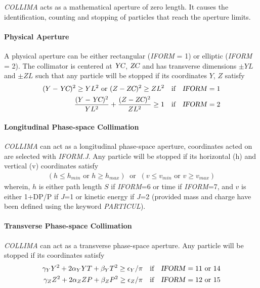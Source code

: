 \textsl{COLLIMA}  acts as a mathematical aperture of zero length.  It causes 
the identification, counting and stopping of particles that reach the aperture limits.  

\paragraph{Physical Aperture}

\noindent A physical aperture can be either rectangular (\textsl{IFORM} = 1) or elliptic 
(\textsl{IFORM} = 2).  The collimator is centered at $ \textsl{YC}$, $\textsl{ZC} $ and has transverse
dimensions $\pm YL $ and $\pm ZL $ such that any particle will be
stopped if its coordinates $Y$, $Z $ satisfy
\begin{align*}
	(Y-\textsl{YC})^2\geq  YL^2  \text{ or }   (Z-\textsl{ZC})^2 \geq  ZL^2 
	   &   \quad \text{if}\quad  \text{\textsl{IFORM}}=1  \\
	\dfrac{ (Y-\textsl{YC})^2 }{ YL^2} + \dfrac{(Z-\textsl{ZC})^2 }{ ZL^2} \geq 1  
	  &   \quad \text{if}\quad  \text{\textsl{IFORM}}=2  
\end{align*}

\paragraph{Longitudinal Phase-space Collimation} 

\noindent \textsl{COLLIMA}  can act as a longitudinal phase-space aperture, coordinates acted on are 
selected with  \textsl{IFORM.J}. 
Any particle will be stopped  if its horizontal  (h) and vertical (v) coordinates satisfy 
\begin{align*}
	 (h \leq h_{min} \textrm{~or~} h \geq  h_{max})  ~\textrm{~or~}~  (v \leq v_{min}  \textrm{~or~}  v \geq  v_{max})
\end{align*}
wherein, $h$ is either path length $S$ if \textsl{IFORM}=6 or time  if \textsl{IFORM}=7, and 
$v$  is either 1+DP/P if \textsl{J}=1 or kinetic energy  if \textsl{J}=2 (provided mass and charge have 
been defined using the keyword \textsl{PARTICUL}). 




\paragraph{Transverse Phase-space Collimation}

\noindent \textsl{COLLIMA}  can act as a transverse phase-space aperture. 
Any particle will be stopped if its coordinates satisfy 
\begin{align*}
	\gamma_Y Y^2 + 2\alpha_Y Y T + \beta_Y T^2 \geq  \epsilon_Y/\pi 
	   &   \quad \text{if}\quad  \text{\textsl{IFORM}}=11  \text{ or 14} \\
	\gamma_Z Z^2 + 2\alpha_Z Z P + \beta_Z P^2 \geq  \epsilon_Z/\pi 
	   &   \quad \text{if}\quad  \text{\textsl{IFORM}}=12  \text{ or 15}
\end{align*}

